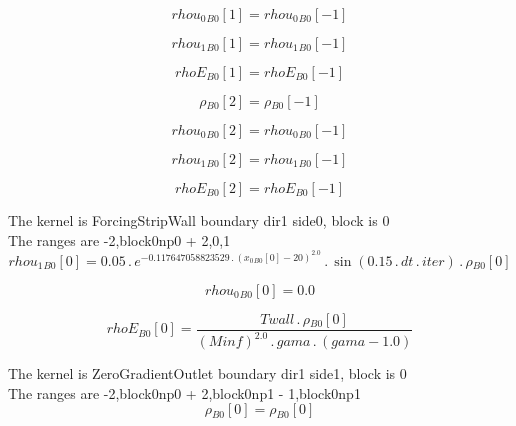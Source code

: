 \documentclass{article}
\begin{document}
\begin{dmath}{rhou_{0}{_{B0}}}[{1}] = {rhou_{0}{_{B0}}}[{-1}]\end{dmath}

\begin{dmath}{rhou_{1}{_{B0}}}[{1}] = {rhou_{1}{_{B0}}}[{-1}]\end{dmath}

\begin{dmath}{rhoE{_{B0}}}[{1}] = {rhoE{_{B0}}}[{-1}]\end{dmath}

\begin{dmath}{\rho{_{B0}}}[{2}] = {\rho{_{B0}}}[{-1}]\end{dmath}

\begin{dmath}{rhou_{0}{_{B0}}}[{2}] = {rhou_{0}{_{B0}}}[{-1}]\end{dmath}

\begin{dmath}{rhou_{1}{_{B0}}}[{2}] = {rhou_{1}{_{B0}}}[{-1}]\end{dmath}

\begin{dmath}{rhoE{_{B0}}}[{2}] = {rhoE{_{B0}}}[{-1}]\end{dmath}

\noindent The kernel is ForcingStripWall boundary dir1 side0, block is 0\\\noindent The ranges are -2,block0np0 + 2,0,1\\\begin{dmath}{rhou_{1}{_{B0}}}[{0}] = 0.05 \,.\, e^{- 0.117647058823529 \,.\, \left({x_{0}{_{B0}}}[{0}] - 20 \right)^{2.0}} \,.\, \sin{\left (0.15 \,.\, dt \,.\, iter \right )} \,.\, {\rho{_{B0}}}[{0}]\end{dmath}

\begin{dmath}{rhou_{0}{_{B0}}}[{0}] = 0.0\end{dmath}

\begin{dmath}{rhoE{_{B0}}}[{0}] = \frac{Twall \,.\, {\rho{_{B0}}}[{0}]}{\left(Minf \right)^{2.0} \,.\, gama \,.\, \left(gama - 1.0\right)}\end{dmath}

\noindent The kernel is ZeroGradientOutlet boundary dir1 side1, block is 0\\\noindent The ranges are -2,block0np0 + 2,block0np1 - 1,block0np1\\\begin{dmath}{\rho{_{B0}}}[{0}] = {\rho{_{B0}}}[{0}]\end{dmath}
\end{document}
